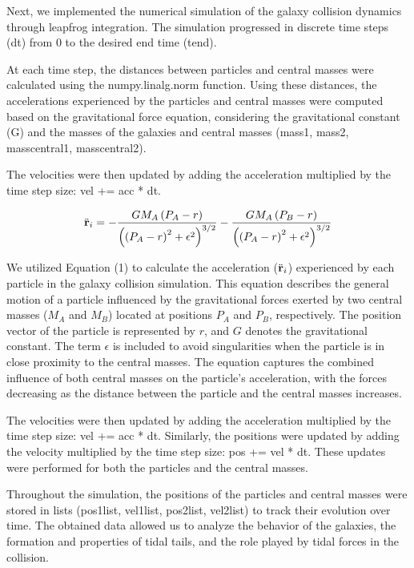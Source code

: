 \documentclass[reprint, amsmath, amssymb, aps]{revtex4-2}
\begin{document}
Next, we implemented the numerical simulation of the galaxy collision dynamics through leapfrog integration. The simulation progressed in discrete time steps (dt) from 0 to the desired end time (t\textunderscore end).

At each time step, the distances between particles and central masses were calculated using the numpy.linalg.norm function. Using these distances, the accelerations experienced by the particles and central masses were computed based on the gravitational force equation, considering the gravitational constant (G) and the masses of the galaxies and central masses (mass1, mass2, mass\textunderscore central1, mass\textunderscore central2).

The velocities were then updated by adding the acceleration multiplied by the time step size: vel += acc * dt.

\begin{equation}
\ddot{{\bf r}}_i = - \frac{GM_A\left(P_A - r\right)}{\left(\left(P_A - r\right)^2 + \epsilon^2\right)^{3/2}} - \frac{GM_A\left(P_B - r\right)}{\left(\left(P_A - r\right)^2 + \epsilon^2\right)^{3/2}} 
\label{eq:general_motion}
\end{equation}

We utilized Equation (1) to calculate the acceleration ($\ddot{{\bf r}}_i$) experienced by each particle in the galaxy collision simulation. This equation describes the general motion of a particle influenced by the gravitational forces exerted by two central masses ($M_A$ and $M_B$) located at positions $P_A$ and $P_B$, respectively. The position vector of the particle is represented by $r$, and $G$ denotes the gravitational constant. The term $\epsilon$ is included to avoid singularities when the particle is in close proximity to the central masses. The equation captures the combined influence of both central masses on the particle's acceleration, with the forces decreasing as the distance between the particle and the central masses increases.

The velocities were then updated by adding the acceleration multiplied by the time step size: vel += acc * dt. Similarly, the positions were updated by adding the velocity multiplied by the time step size: pos += vel * dt. These updates were performed for both the particles and the central masses.

Throughout the simulation, the positions of the particles and central masses were stored in lists (pos1\textunderscore list, vel1\textunderscore list, pos2\textunderscore list, vel2\textunderscore list) to track their evolution over time. The obtained data allowed us to analyze the behavior of the galaxies, the formation and properties of tidal tails, and the role played by tidal forces in the collision.
\end{document}
